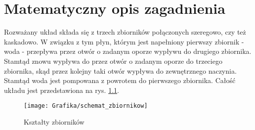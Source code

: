 \chapter{Matematyczny opis zagadnienia}
\label{cha:model}

Rozważany układ składa się z trzech zbiorników połączonych szeregowo, czy też kaskadowo. W związku z tym płyn, którym jest napełniony pierwszy zbiornik - woda - przepływa przez otwór o zadanym oporze wypływu do drugiego zbiornika. Stamtąd znowu wypływa do przez otwór o zadanym oporze do trzeciego zbiornika, skąd przez kolejny taki otwór wypływa do zewnętrznego naczynia. Stamtąd woda jest pompowana z powrotem do pierwszego zbiornika. Całość układu jest przedstawiona na rys. \ref{fig:zbiorniki}.


\begin{figure}[ht]
	\centering
	\texttt{[image: Grafika/schemat\_zbiornikow]}
	\caption{Kształty zbiorników}\label{fig:zbiorniki}
\end{figure}







